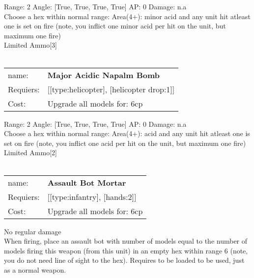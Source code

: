 Range: 2  Angle: [True, True, True, True] AP: 0 Damage: n.a \\
Choose a hex within normal range: Area(4+): minor acid and any unit hit atleast one is set on fire (note, you inflict one minor acid per hit on the unit, but maximum one fire)\\ 
Limited Ammo[3]\\ 








\ \\
\begin{tabular}{ll}
name: & {\bf Major Acidic Napalm Bomb } \\
Requiers: & [[type:helicopter], [helicopter drop:1]] \\
Cost: & Upgrade all models for: 6cp \\
\end{tabular}



Range: 2  Angle: [True, True, True, True] AP: 0 Damage: n.a \\
Choose a hex within normal range: Area(4+): acid and any unit hit atleast one is set on fire (note, you inflict one acid per hit on the unit, but maximum one fire)\\ 
Limited Ammo[2]\\ 








\ \\
\begin{tabular}{ll}
name: & {\bf Assault Bot Mortar } \\
Requiers: & [[type:infantry], [hands:2]] \\
Cost: & Upgrade all models for: 6cp \\
\end{tabular}

No regular damage\\ 
When firing, place an assault bot with number of models equal to the number of models firing this weapon (from this unit) in an empty hex within range 6 (note, you do not need line of sight to the hex). Requires to be loaded to be used, just as a normal weapon.\\ 










